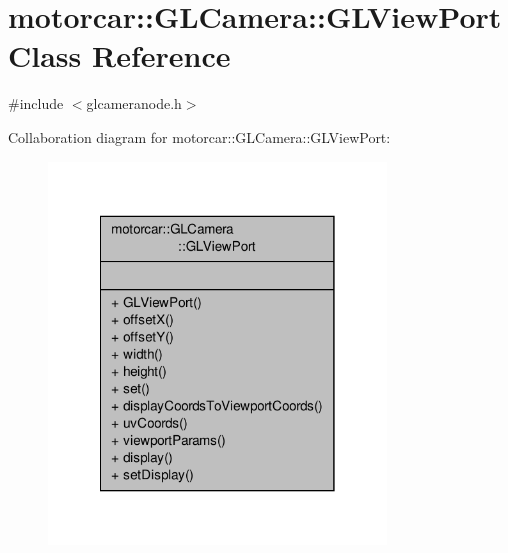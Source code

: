 \hypertarget{classmotorcar_1_1GLCamera_1_1GLViewPort}{\section{motorcar\-:\-:G\-L\-Camera\-:\-:G\-L\-View\-Port Class Reference}
\label{classmotorcar_1_1GLCamera_1_1GLViewPort}
}


{\ttfamily \#include $<$glcameranode.\-h$>$}



Collaboration diagram for motorcar\-:\-:G\-L\-Camera\-:\-:G\-L\-View\-Port\-:
\nopagebreak
\begin{figure}[H]
\begin{center}
\leavevmode
\includegraphics[width=254pt]{classmotorcar_1_1GLCamera_1_1GLViewPort__coll__graph}
\end{center}
\end{figure}
